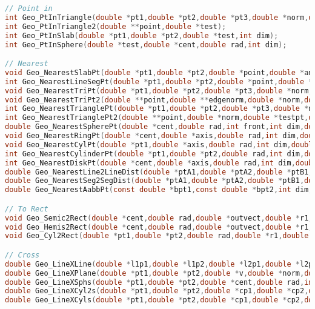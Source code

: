 \documentclass[11pt]{article}
\begin{document}
\begin{lstlisting}[language=C]
// Point in
int Geo_PtInTriangle(double *pt1,double *pt2,double *pt3,double *norm,double *test);
int Geo_PtInTriangle2(double **point,double *test);
int Geo_PtInSlab(double *pt1,double *pt2,double *test,int dim);
int Geo_PtInSphere(double *test,double *cent,double rad,int dim);

// Nearest
void Geo_NearestSlabPt(double *pt1,double *pt2,double *point,double *ans,int dim);
int Geo_NearestLineSegPt(double *pt1,double *pt2,double *point,double *ans,int dim,double margin);
void Geo_NearestTriPt(double *pt1,double *pt2,double *pt3,double *norm,double *point,double *ans);
void Geo_NearestTriPt2(double **point,double **edgenorm,double *norm,double *testpt,double *ans);
int Geo_NearestTrianglePt(double *pt1,double *pt2,double *pt3,double *norm,double *point,double *ans);
int Geo_NearestTrianglePt2(double **point,double *norm,double *testpt,double *ans,double margin);
double Geo_NearestSpherePt(double *cent,double rad,int front,int dim,double *point,double *ans);
void Geo_NearestRingPt(double *cent,double *axis,double rad,int dim,double *point,double *ans);
void Geo_NearestCylPt(double *pt1,double *axis,double rad,int dim,double *point,double *ans);
int Geo_NearestCylinderPt(double *pt1,double *pt2,double rad,int dim,double *point,double *ans,double margin);
int Geo_NearestDiskPt(double *cent,double *axis,double rad,int dim,double *point,double *ans,double margin);
double Geo_NearestLine2LineDist(double *ptA1,double *ptA2,double *ptB1,double *ptB2);
double Geo_NearestSeg2SegDist(double *ptA1,double *ptA2,double *ptB1,double *ptB2);
double Geo_NearestAabbPt(const double *bpt1,const double *bpt2,int dim,const double *point,double *ans);

// To Rect
void Geo_Semic2Rect(double *cent,double rad,double *outvect,double *r1,double *r2,double *r3);
void Geo_Hemis2Rect(double *cent,double rad,double *outvect,double *r1,double *r2,double *r3,double *r4);
void Geo_Cyl2Rect(double *pt1,double *pt2,double rad,double *r1,double *r2,double *r3,double *r4);

// Cross
double Geo_LineXLine(double *l1p1,double *l1p2,double *l2p1,double *l2p2,double *crss2ptr);
double Geo_LineXPlane(double *pt1,double *pt2,double *v,double *norm,double *crsspt);
double Geo_LineXSphs(double *pt1,double *pt2,double *cent,double rad,int dim,double *crss2ptr,double *nrdistptr,double *nrposptr);
double Geo_LineXCyl2s(double *pt1,double *pt2,double *cp1,double *cp2,double *norm,double rad,double *crss2ptr,double *nrdistptr,double *nrposptr);
double Geo_LineXCyls(double *pt1,double *pt2,double *cp1,double *cp2,double rad,double *crss2ptr,double *nrdistptr,double *nrposptr);


\end{lstlisting}
\end{document}
